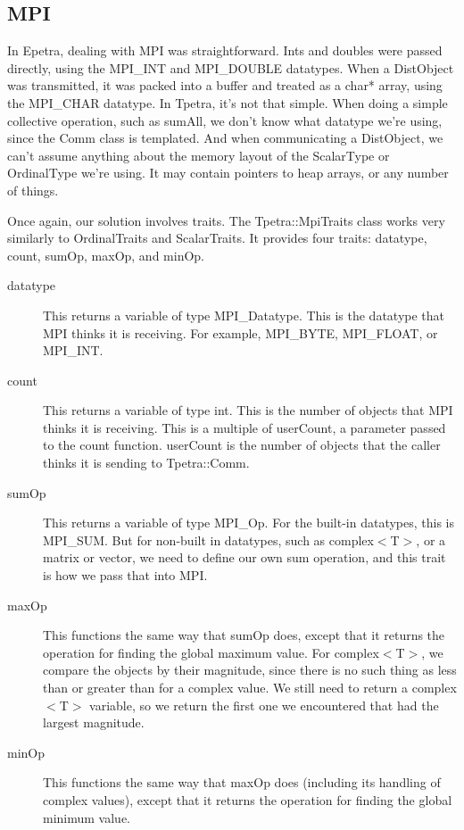 \documentclass[10pt,relax]{TpetraDesign}
\begin{document}
%
\subsection{MPI}
In Epetra, dealing with MPI was straightforward. Ints and doubles were passed directly, using the MPI\_INT and MPI\_DOUBLE datatypes. When a DistObject was transmitted, it was packed into a buffer and treated as a char* array, using the MPI\_CHAR datatype. In Tpetra, it's not that simple. When doing a simple collective operation, such as sumAll, we don't know what datatype we're using, since the Comm class is templated. And when communicating a DistObject, we can't assume anything about the memory layout of the ScalarType or OrdinalType we're using. It may contain pointers to heap arrays, or any number of things.

Once again, our solution involves traits. The Tpetra::MpiTraits class works very similarly to OrdinalTraits and ScalarTraits. It provides four traits: datatype, count, sumOp, maxOp, and minOp.
\begin{description}

\item[datatype] This returns a variable of type MPI\_Datatype. This is the datatype that MPI thinks it is receiving. For example, MPI\_BYTE, MPI\_FLOAT, or MPI\_INT.

\item[count] This returns a variable of type int. This is the number of objects that MPI thinks it is receiving. This is a multiple of userCount, a parameter passed to the count function. userCount is the number of objects that the caller thinks it is sending to Tpetra::Comm.

\item[sumOp] This returns a variable of type MPI\_Op. For the built-in datatypes, this is MPI\_SUM. But for non-built in datatypes, such as complex$<$T$>$, or a matrix or vector, we need to define our own sum operation, and this trait is how we pass that into MPI.

\item[maxOp] This functions the same way that sumOp does, except that it returns the operation for finding the global maximum value. For complex$<$T$>$, we compare the objects by their magnitude, since there is no such thing as less than or greater than for a complex value. We still need to return a complex$<$T$>$ variable, so we return the first one we encountered that had the largest magnitude.

\item[minOp] This functions the same way that maxOp does (including its handling of complex values), except that it returns the operation for finding the global minimum value.
\end{description}
\end{document}
